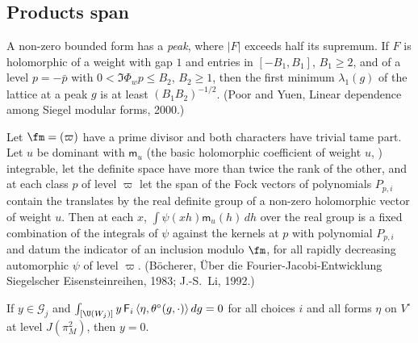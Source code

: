 \subsection{Products span}\label{ol-compare:sec:span}

\begin{fact}
\label{ol-compare:fact:peaks}
A non-zero bounded form has a \emph{peak}, where $|F|$ exceeds half its supremum. If $F$ is
holomorphic of a weight with gap $1$ and entries in $[-B_1,B_1]$, $B_1\ge2$, and of a level $p=-\bar p$
with $0<\Im\Phi_wp\le B_2$, $B_2\ge1$, then the first minimum $\lambda_1(g)$ of the lattice at a peak $g$
is at least $(B_1B_2)^{-1/2}$. (Poor and Yuen, Linear dependence among Siegel modular forms, 2000.)
\end{fact}

\begin{fact}
\label{ol-compare:fact:repro}
Let $\fm=(\varpi)$ have a prime divisor and both characters have trivial tame part. Let $u$ be dominant with $\mathsf m_u$ (the basic holomorphic coefficient of weight $u$,
) integrable, let the definite space have more than twice the rank of the other,
and at each class $p$ of level $\varpi$ let the span of the Fock vectors of polynomials $P_{p,i}$ contain the
translates by the real definite group of a non-zero holomorphic vector of weight $u$. Then at each $x$,
$\int\psi(xh)\mathsf m_u(h)\,dh$ over the real group is a fixed combination of the integrals of $\psi$ against the
kernels at $p$ with polynomial $P_{p,i}$ and datum the indicator of an inclusion modulo $\fm$, for all rapidly
decreasing automorphic $\psi$ of level $\varpi$. (B\"ocherer, \"Uber die Fourier-Jacobi-Entwicklung Siegelscher
Eisensteinreihen, 1983; J.-S.~Li, 1992.)
\end{fact}

\begin{theorem}\label{ol-compare:thm:span}
If $y\in\mathcal G_j$ and $\int_{[\U(W_j)]}y\,\mathsf F_i\,\langle\eta,\theta^\circ(g,\cdot)\rangle\,dg=0$ for all
choices $i$ and all forms $\eta$ on $V^\circ$ at level $J(\pi_M^2)$, then $y=0$.
\end{theorem}

